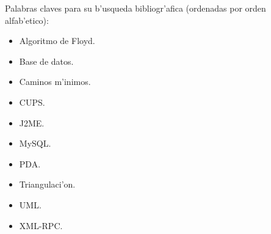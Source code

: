 Palabras claves para su b'usqueda bibliogr'afica (ordenadas por orden alfab'etico):
\begin{itemize}
	\item Algoritmo de Floyd. 
	\item Base de datos.
	\item Caminos m'inimos.
	\item CUPS.
	\item J2ME.
	\item MySQL.
	\item PDA.
	\item Triangulaci'on.  
	\item UML. 
	\item XML-RPC.	
\end{itemize} 



